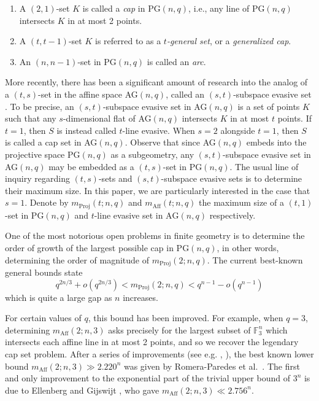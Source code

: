 \documentclass[12pt]{article}
\newcommand{\F}{\mathbb{F}}
\newcommand{\PG}{\text{PG}}
\newcommand{\AG}{\text{AG}}
\newcommand{\mpr}[3]{m_{\text{Proj}}(#1 ; #2, #3)}
\newcommand{\mpa}[3]{m_{\text{Aff}}(#1 ; #2, #3)}
\begin{document}
\begin{enumerate}
    \item A $(2, 1)$-set $K$ is called a \textit{cap} in PG$(n, q)$, i.e., any line of PG$(n, q)$ intersects $K$ in at most 2 points.
    \item A $(t, t-1)$-set $K$ is referred to as a \textit{$t$-general set}, or a \textit{generalized cap}.
    \item An $(n, n-1)$-set in PG$(n, q)$ is called an \textit{arc}.
\end{enumerate}

More recently, there has been a significant amount of research into the analog of a $(t, s)$-set in the affine space AG$(n, q)$, called an $(s, t)$-subspace evasive set \cite{PudlakRodl2004}. To be precise, an $(s, t)$-subspace evasive set in AG$(n, q)$ is a set of points $K$ such that any $s$-dimensional flat of AG$(n, q)$ intersects $K$ in at most $t$ points. If $t = 1$, then $S$ is instead called $t$-line evasive. When $s = 2$ alongside $t=1$, then $S$ is called a cap set in AG$(n, q)$. Observe that since AG$(n, q)$ embeds into the projective space PG$(n, q)$ as a subgeometry, any $(s, t)$-subspace evasive set in AG$(n, q)$ may be embedded as a $(t, s)$-set in PG$(n, q)$. The usual line of inquiry regarding $(t, s)$-sets and $(s, t)$-subspace evasive sets is to determine their maximum size. In this paper, we are particularly interested in the case that $s = 1$. Denote by $\mpr{t}{n}{q}$ and $\mpa{t}{n}{q}$ the maximum size of a $(t, 1)$-set in $\PG(n, q)$ and $t$-line evasive set in $\AG(n, q)$ respectively.

One of the most notorious open problems in finite geometry is to determine the order of growth of the largest possible cap in PG$(n, q)$, in other words, determining the order of magnitude of $\mpr{2}{n}{q}$. The current best-known general bounds state \cite{HirschfeldStorme2001}
\begin{equation}
    q^{2n/3} + o(q^{2n/3}) <  \mpr{2}{n}{q} < q^{n-1} - o(q^{n-1})
\end{equation}
which is quite a large gap as $n$ increases. 

For certain values of $q$, this bound has been improved. For example, when $q = 3$, determining $\mpa{2}{n}{3}$ asks precisely for the largest subset of $\F_3^n$ which intersects each affine line in at most 2 points, and so we recover the legendary cap set problem.
After a series of improvements (see e.g. \cite{Edel}, \cite{Tyrrell}), the best known lower bound $\mpa{2}{n}{3} \gg 2.220^n$ was given by Romera-Paredes et al.~\cite{DeepMind}.
The first and only improvement to the exponential part of the trivial upper bound of $3^n$ is due to Ellenberg and Gijswijt \cite{EG}, who gave $\mpa{2}{n}{3} \ll2.756^n$.
\end{document}
